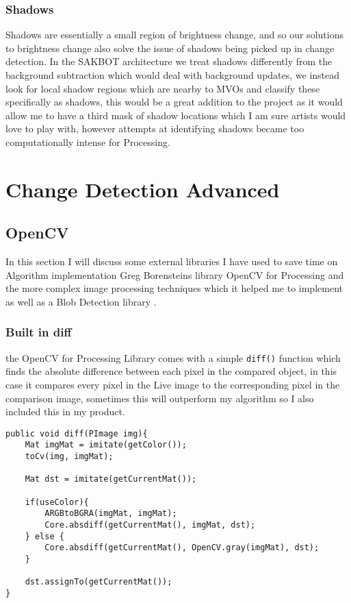 \documentclass[a4paper]{report}
\begin{document}
\subsubsection{Shadows}
Shadows are essentially a small region of brightness change, and so our solutions to brightness change also solve the issue of shadows being picked up in change detection. In the SAKBOT architecture\cite{SAKBOT} we treat shadows differently from the background subtraction which would deal with background updates, we instead look for local shadow regions which are nearby to MVOs and classify these specifically as shadows, this would be a great addition to the project as it would allow me to have a third mask of shadow locations which I am sure artists would love to play with, however attempts at identifying shadows became too computationally intense for Processing\cite{PROCESSING}.

\section{Change Detection Advanced}
\subsection{OpenCV}
In this section I will discuss some external libraries I have used to save time on Algorithm implementation Greg Borensteins library OpenCV for Processing \cite{OPENCV} and the more complex image processing techniques which it helped me to implement as well as a Blob Detection library \cite{BLOB}.

\subsubsection{Built in diff}
the OpenCV for Processing Library comes with a simple \verb|diff()| function which finds the absolute difference between each pixel in the compared object, in this case it compares every pixel in the Live image to the corresponding pixel in the comparison image, sometimes this will outperform my algorithm so I also included this in my product.

\begin{lstlisting}
public void diff(PImage img){
	Mat imgMat = imitate(getColor());
	toCv(img, imgMat);

	Mat dst = imitate(getCurrentMat());

	if(useColor){
		ARGBtoBGRA(imgMat, imgMat);
		Core.absdiff(getCurrentMat(), imgMat, dst);
	} else {
		Core.absdiff(getCurrentMat(), OpenCV.gray(imgMat), dst);
	}
		
	dst.assignTo(getCurrentMat());
}
\end{lstlisting}
\end{document}
